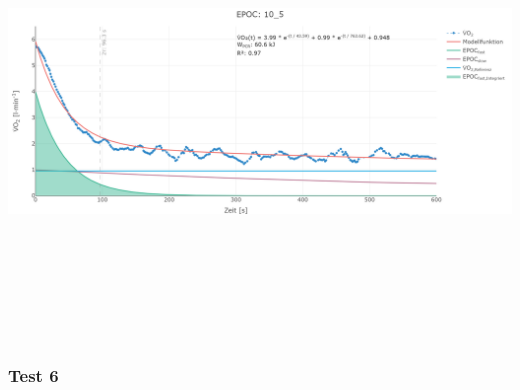 \documentclass[
  letterpaper,
  DIV=11]{scrartcl}
\begin{document}
\includegraphics[width=11.45833in,height=4.6875in]{images/10_5.png}

\subsubsection{Test 6}
\end{document}
